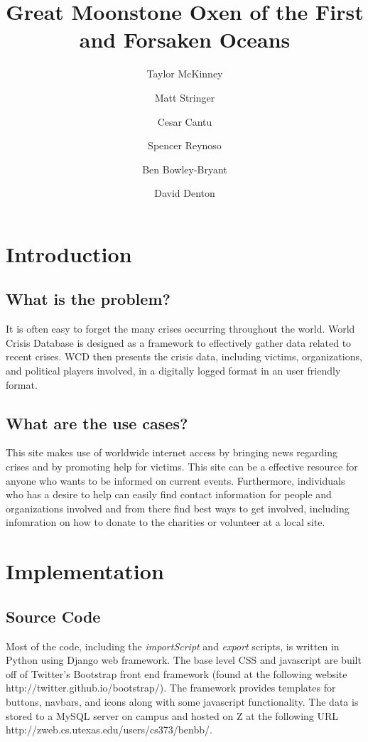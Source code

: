 \documentclass[12pt]{report}
\title{Great Moonstone Oxen of the First and Forsaken Oceans}
\author{
    Taylor McKinney
    \and Matt Stringer
    \and Cesar Cantu
    \and Spencer Reynoso
    \and Ben Bowley-Bryant
    \and David Denton}
\begin{document}
\maketitle

\section*{Introduction}
\subsection*{What is the problem?}
\hfill


It is often easy to forget the many crises occurring throughout the world.
World Crisis Database is designed as a framework to effectively gather data related to recent crises. WCD then presents the crisis data, including victims, organizations, and political players involved, in a digitally logged format in an user friendly format. 

\subsection*{What are the use cases?}
\hfill


This site makes use of worldwide internet access by bringing news regarding crises and by promoting help for victims. This site can be a effective resource for anyone who wants to be informed on current events. Furthermore, individuals who has a desire to help can easily find contact information for people and organizations involved and from there find best ways to get involved, including infomration on how to donate to the charities or volunteer at a local site.


\section*{Implementation}
\hfill


\subsection*{Source Code}
\hfill


Most of the code, including the \emph{importScript} and \emph{export} scripts, is written in Python using Django web framework. The base level CSS and javascript are built off of Twitter's Bootstrap front end framework (found at the following website http://twitter.github.io/bootstrap/). The framework provides templates for buttons, navbars, and icons along with some javascript functionality. The data is stored to a MySQL server on campus and hosted on Z at the following URL http://zweb.cs.utexas.edu/users/cs373/benbb/.
\end{document}
